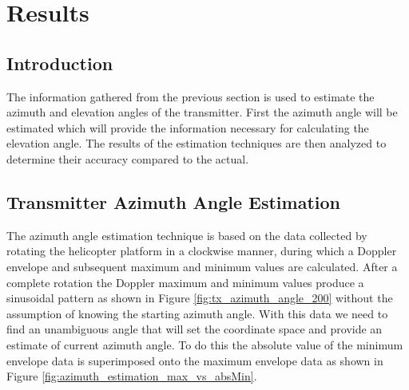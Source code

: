 \chapter{Results} \label{ch:results}

\section{Introduction}
The information gathered from the previous section is used to estimate the azimuth and elevation angles of the transmitter. First the azimuth angle will be estimated which will provide the information necessary for calculating the elevation angle. The results of the estimation techniques are then analyzed to determine their accuracy compared to the actual.


\section{Transmitter Azimuth Angle Estimation} \label{sec:transmitter_azimuth_angle_estimation}
The azimuth angle estimation technique is based on the data collected by rotating the helicopter platform in a clockwise manner, during which a Doppler envelope and subsequent maximum and minimum values are calculated. After a complete rotation the Doppler maximum and minimum values produce a sinusoidal pattern as shown in Figure \ref{fig:tx_azimuth_angle_200} without the assumption of knowing the starting azimuth angle. With this data we need to find an unambiguous angle that will set the coordinate space and provide an estimate of current azimuth angle. To do this the absolute value of the minimum envelope data is superimposed onto the maximum envelope data as shown in Figure \ref{fig:azimuth_estimation_max_vs_absMin}.

